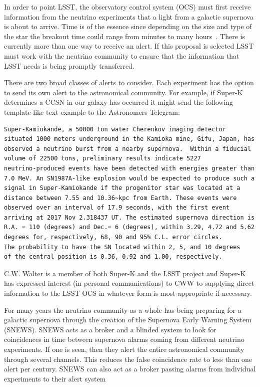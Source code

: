 \documentclass[12pt, letterpaper]{article}
\newcommand{\superk}  {Super\nobreakdash-K\xspace}
\begin{document}
In order to point LSST, the observatory control system (OCS) must
first receive information from the neutrino experiments that a light
from a galactic supernova is about to arrive.  Time is of the essence
since depending on the size and type of the star the breakout time
could range from minutes to many hours~\cite{2013ApJ...778...81K}.
There is currently more than one way to receive an alert. If this
proposal is selected LSST must work with the neutrino community to
ensure that the information that LSST needs is being promptly
transferred.

There are two broad classes of alerts to consider.  Each experiment
has the option to send its own alert to the astronomical community.
For example, if \superk determines a CCSN in our galaxy has occurred
it might send the following template-like text example to the Astronomers
Telegram:

\begin{verbatim}
Super-Kamiokande, a 50000 ton water Cherenkov imaging detector
situated 1000 meters underground in the Kamioka mine, Gifu, Japan, has
observed a neutrino burst from a nearby supernova.  Within a fiducial
volume of 22500 tons, preliminary results indicate 5227
neutrino-produced events have been detected with energies greater than
7.0 MeV. An SN1987A-like explosion would be expected to produce such a
signal in Super-Kamiokande if the progenitor star was located at a
distance between 7.55 and 10.36~kpc from Earth. These events were
observed over an interval of 17.9 seconds, with the first event
arriving at 2017 Nov 2.318437 UT. The estimated supernova direction is
R.A. = 110 (degrees) and Dec.= 6 (degrees), within 3.29, 4.72 and 5.62
degrees for, respectively, 68, 90 and 95% C.L. error circles. 
The probability to have the SN located within 2, 5, and 10 degrees 
of the central position is 0.36, 0.92 and 1.00, respectively.
\end{verbatim}

C.W. Walter is a member of both \superk and the LSST project and
\superk has expressed interest (in personal communications) to CWW to
supplying direct information to the LSST OCS in whatever form is most
appropriate if necessary.

For many years the neutrino community as a whole has being preparing
for a galactic supernova through the creation of the Supernova Early
Warning System (SNEWS).  SNEWS acts as a
broker and a blinded system to look for coincidences in time between
supernova alarms coming from different neutrino experiments. If one is
seen, then they alert the entire astronomical community through several
channels. This reduces the false coincidence rate to less than one
alert per century. SNEWS can also act as a broker passing alarms from
individual experiments to their alert system
\end{document}
